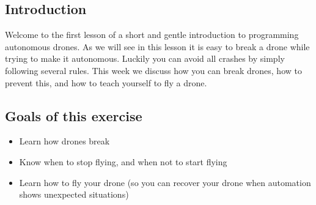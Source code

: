 \documentclass{article}
\begin{document}

\subsection*{Introduction}
Welcome to the first lesson of a short and gentle introduction to programming autonomous drones. As we will see in this lesson it is easy to break a drone while trying to make it autonomous. Luckily you can avoid all crashes by simply following several rules. This week we discuss how you can break drones, how to prevent this, and how to teach yourself to fly a drone. 

\subsection*{Goals of this exercise}
\begin{itemize}
\item Learn how drones break
\item Know when to stop flying, and when not to start flying
\item Learn how to fly your drone (so you can recover your drone when automation shows unexpected situations)
\end{itemize}
\end{document}
